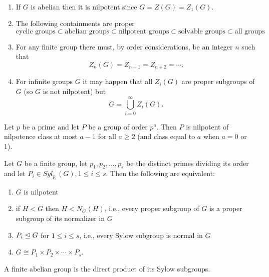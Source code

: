 \documentclass[../main]{subfiles}
\begin{document}
\begin{nt}
 ~\begin{enumerate}
   \item If $G$ is abelian then it is nilpotent since $G = Z(G) =Z_1(G)$.
   
   \item The following containments are proper
   \[ \text{cyclic groups} \subset \text{abelian groups} \subset \text{nilpotent groups} \subset \text{solvable groups} \subset \text{all groups} \]
   
   \item For any finite group there must, by order considerations, be an integer $n$ such that
   \[ Z_n(G) = Z_{n+1} = Z_{n+2} = \cdots. \]
   
   \item For infinite groups $G$ it may happen that all $Z_i(G)$ are proper subgroups of $G$ (so $G$ is not nilpotent) but 
   \[ G = \bigcup_{i=0}^\infty Z_i(G). \]
  \end{enumerate}
\end{nt}


\begin{prop}
 Let $p$ be a prime and let $P$ be a group of order $p^a$. Then $P$ is nilpotent of nilpotence class at most $a-1$ for all $a\geq 2$ (and class equal to $a$ when $a = 0$ or 1).
\end{prop}


\begin{thm}
 Let $G$ be a finite group, let $p_1, p_2, \ldots, p_s$ be the distinct primes dividing its order and let $P_i \in Syl_{p_i}(G), 1\leq i \leq s$. Then the following are equivalent:
 \begin{enumerate}
  \item $G$ is nilpotent 
  
  \item if $H < G$ then $H < N_G(H)$, i.e., every proper subgroup of $G$ is a proper subgroup of its normalizer in $G$
  
  \item $P_i \trianglelefteq G$ for $1 \leq i \leq s$, i.e., every Sylow subgroup is normal in $G$
  
  \item $G \cong P_1 \times P_2 \times \cdots \times P_s$.
 \end{enumerate}
\end{thm}


\begin{cor}
 A finite abelian group is the direct product of its Sylow subgroups. 
\end{cor}
\end{document}
